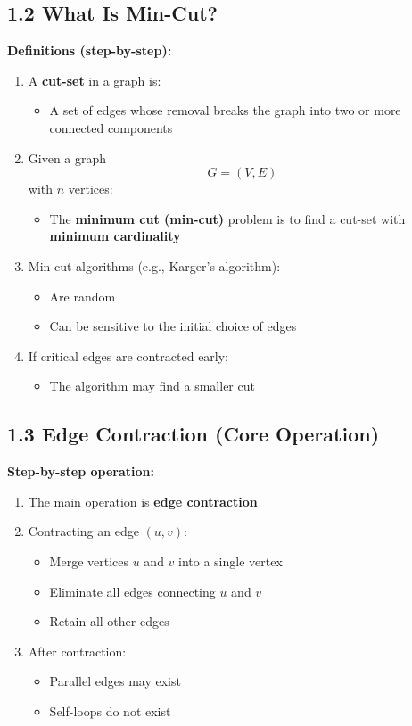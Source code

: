 \documentclass[11pt]{article}
\begin{document}
\subsection*{1.2 What Is Min-Cut?}

\textbf{Definitions (step-by-step):}
\begin{enumerate}
    \item A \textbf{cut-set} in a graph is:
    \begin{itemize}
        \item A set of edges whose removal breaks the graph into two or more connected components
    \end{itemize}
    \item Given a graph
    \[
    G = (V, E)
    \]
    with \( n \) vertices:
    \begin{itemize}
        \item The \textbf{minimum cut (min-cut)} problem is to find a cut-set with \textbf{minimum cardinality}
    \end{itemize}
    \item Min-cut algorithms (e.g., Karger’s algorithm):
    \begin{itemize}
        \item Are random
        \item Can be sensitive to the initial choice of edges
    \end{itemize}
    \item If critical edges are contracted early:
    \begin{itemize}
        \item The algorithm may find a smaller cut
    \end{itemize}
\end{enumerate}

\subsection*{1.3 Edge Contraction (Core Operation)}

\textbf{Step-by-step operation:}
\begin{enumerate}
    \item The main operation is \textbf{edge contraction}
    \item Contracting an edge \( (u, v) \):
    \begin{itemize}
        \item Merge vertices \( u \) and \( v \) into a single vertex
        \item Eliminate all edges connecting \( u \) and \( v \)
        \item Retain all other edges
    \end{itemize}
    \item After contraction:
    \begin{itemize}
        \item Parallel edges may exist
        \item Self-loops do not exist
    \end{itemize}
\end{enumerate}
\end{document}
